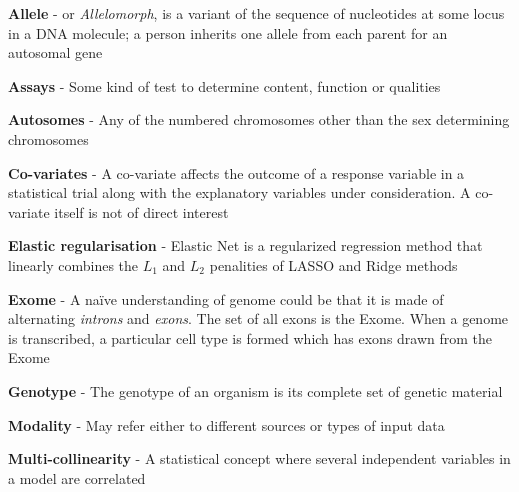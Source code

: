 \begin{mybox}
    \textbf{Allele} - or \textit{Allelomorph}, is a variant of the sequence of
    nucleotides at some locus in a DNA molecule; a person inherits one allele from
    each parent for an autosomal gene
\end{mybox}

\begin{mybox}
    \textbf{Assays} - Some kind of test to determine content, function or qualities
\end{mybox}

\begin{mybox}
    \textbf{Autosomes} - Any of the numbered chromosomes other than the sex determining
    chromosomes
\end{mybox}

\begin{mybox}
    \textbf{Co-variates} - A co-variate affects the outcome of a response variable
    in a statistical trial along with the explanatory variables under consideration.
    A co-variate itself is not of direct interest
\end{mybox}

\begin{mybox}
    \textbf{Elastic regularisation} - Elastic Net is a regularized regression method
    that linearly combines the $L_1$ and $L_2$ penalities of LASSO and Ridge methods
\end{mybox}

\begin{mybox}
    \textbf{Exome} - A na\"{i}ve understanding of genome could be that it is made
    of alternating \textit{introns} and \textit{exons}. The set of all exons is the
    Exome. When a genome is transcribed, a particular cell type is formed which has
    exons drawn from the Exome
\end{mybox}

\begin{mybox}
    \textbf{Genotype} - The genotype of an organism is its complete set of
    genetic material
\end{mybox}

\begin{mybox}
    \textbf{Modality} - May refer either to different sources or types of input
    data
\end{mybox}

\begin{mybox}
    \textbf{Multi-collinearity} - A statistical concept where several independent
    variables in a model are correlated
\end{mybox}

